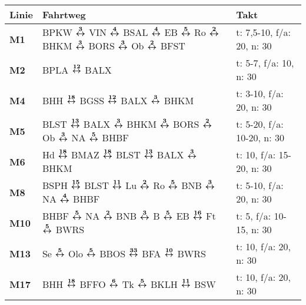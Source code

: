 \begin{minipage}[t]{0.05\textwidth}
\phantom{Tor}
\end{minipage}
\begin{minipage}[t]{0.45\textwidth}
\begin{tabular}{>{\bfseries}L{1.2cm}L{9.0cm}L{3.0cm}}
{\bfseries Linie} & {\bfseries Fahrtweg} & {\bfseries Takt} \\
\hline
\mtram{} M1   & BPKW $\xarwe{3}$ VIN $\xarwe{4}$ BSAL $\xarwe{4}$ EB $\xarwe{5}$ Ro $\xarwe{2}$ BHKM $\xarwe{3}$ BORS $\xarwe{3}$ Ob $\xarwe{2}$ BFST                               & t: 7,5-10, f/a: 20, n: 30  \\
\mtram{} M2   & BPLA $\xarwe{12}$ BALX                                                                                                                                              & t: 5-7, f/a: 10, n: 30     \\
\mtram{} M4   & BHH $\xarwe{18}$ BGSS $\xarwe{12}$ BALX $\xarwe{3}$ BHKM                                                                                                            & t: 3-10, f/a: 20, n: 30    \\
\mtram{} M5   & BLST $\xarwe{13}$ BALX $\xarwe{3}$ BHKM $\xarwe{3}$ BORS $\xarwe{2}$ Ob $\xarwe{3}$ NA $\xarwe{5}$ BHBF                                                             & t: 5-20, f/a: 10-20, n: 30 \\
\mtram{} M6   & Hd $\xarwe{18}$ BMAZ $\xarwe{18}$ BLST $\xarwe{13}$ BALX $\xarwe{3}$ BHKM                                                                                           & t: 10, f/a: 15-20, n: 30   \\
\mtram{} M8   & BSPH $\xarwe{15}$ BLST $\xarwe{11}$ Lu $\xarwe{2}$ Ro $\xarwe{5}$ BNB $\xarwe{3}$ NA $\xarwe{4}$ BHBF                                                               & t: 5-10, f/a: 20, n: 30    \\
\mtram{} M10  & BHBF $\xarwe{5}$ NA $\xarwe{2}$ BNB $\xarwe{3}$ B $\xarwe{5}$ EB $\xarwe{16}$ Ft $\xarwe{5}$ BWRS                                                                   & t: 5, f/a: 10-15, n: 30    \\
\mtram{} M13  & Se $\xarwe{5}$ Olo $\xarwe{5}$ BBOS $\xarwe{33}$ BFA $\xarwe{10}$ BWRS                                                                                              & t: 10, f/a: 20, n: 30      \\
\mtram{} M17  & BHH $\xarwe{18}$ BFFO $\xarwe{6}$ Tk $\xarwe{5}$ BKLH $\xarwe{11}$ BSW                                                                                              & t: 10, f/a: 20, n: 30      \\

\end{tabular}
\end{minipage}
